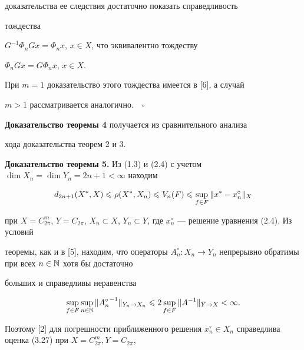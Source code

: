 доказательства ее следствия достаточно показать справедливость


тождества


$G^{-1}\Phi_n Gx = \Phi_n x$, $x\in X$, что эквивалентно тождеству


$\Phi_n Gx = G\Phi_n x$, $x\in X$.


При $m=1$ доказательство этого тождества имеется в [6], а случай


$m>1$ рассматривается аналогично.$\quad\square$


\medskip





{\bf Доказательство теоремы 4} получается из сравнительного анализа


хода доказательства теорем 2 и 3.


\medskip





{\bf Доказательство теоремы 5.} Из (1.3) и (2.4) с учетом $\dim


X_n = \dim Y_n = 2n+1<\infty$ находим


\begin{equation}


d_{2n+1}(X^*,X)\lea \rho(X^*,X_n) \lea V_n(F)\lea


\sup\limits_{f\in F}\|x^* - x_n^\circ\|_X


\end{equation}


при $X = C_{2\pi}^m$, $Y = C_{2\pi}$, $X_n\subset X$, $Y_n\subset


Y$, где $x_n^\circ$ --- решение уравнения (2.4). Из условий


теоремы, как и в [5], находим, что операторы $A_n^\circ:X_n\to


Y_n$ непрерывно обратимы при всех $n\in \N$ хотя бы достаточно


больших и справедливы неравенства


\begin{equation}


\sup\limits_{f\in F}\sup\limits_{n\in\N}\|{A_n^\circ}^{-


1}\|_{Y_n\to X_n}\lea 2 \sup\limits_{f\in F}\|A^{-1}\|_{Y\to X} <\infty.


\end{equation}


Поэтому [2] для погрешности приближенного решения $x_n^\circ\in


X_n$ справедлива оценка (3.27) при $X=C_{2\pi}^m, Y=C_{2\pi}$,


